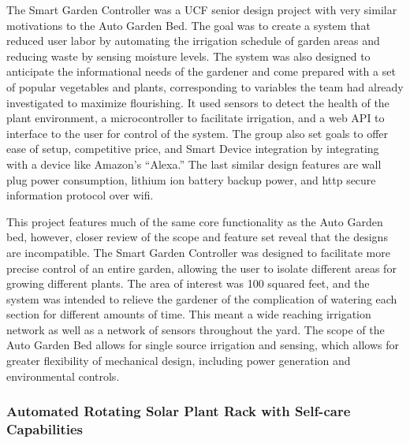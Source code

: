 The Smart Garden Controller was a UCF senior design project with very similar motivations to the Auto Garden Bed. The goal was to create a system that reduced user labor by automating the irrigation schedule of garden areas and reducing waste by sensing moisture levels. The system was also designed to anticipate the informational needs of the gardener and come prepared with a set of popular vegetables and plants, corresponding to variables the team had already investigated to maximize flourishing. It used sensors to detect the health of the plant environment, a microcontroller to facilitate irrigation, and a web API to interface to the user for control of the system. The group also set goals to offer ease of setup, competitive price, and Smart Device integration by integrating with a device like Amazon’s “Alexa.” The last similar design features are wall plug power consumption, lithium ion battery backup power, and http secure information protocol over wifi.

This project features much of the same core functionality as the Auto Garden bed, however, closer review of the scope and feature set reveal that the designs are incompatible. The Smart Garden Controller was designed to facilitate more precise control of an entire garden, allowing the user to isolate different areas for growing different plants. The area of interest was 100 squared feet, and the system was intended to relieve the gardener of the complication of watering each section for different amounts of time. This meant a wide reaching irrigation network as well as a network of sensors throughout the yard. The scope of the Auto Garden Bed allows for single source irrigation and sensing, which allows for greater flexibility of mechanical design, including power generation and environmental controls.

\subsubsection{Automated Rotating Solar Plant Rack with Self-care Capabilities}

